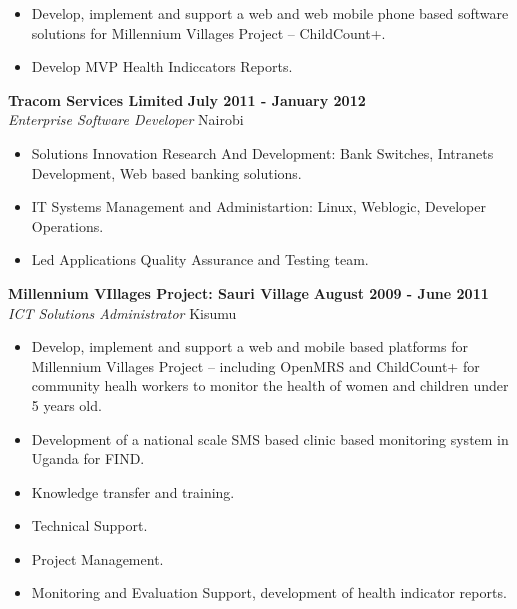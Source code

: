 \documentclass{res}
\begin{document}
\begin{resume}
\begin{itemize} \itemsep -2pt %
        \item Develop, implement and support a web and web mobile phone based software solutions for Millennium Villages Project – ChildCount+.
        \item Develop MVP Health Indiccators Reports.
 \end{itemize} \vspace{-4pt}

\vspace{8pt}
\textbf{Tracom Services Limited} \hfill        \textbf{July 2011 - January 2012} \\
\emph{Enterprise Software Developer}       \hfill   Nairobi

\begin{itemize} \itemsep -2pt %
        \item Solutions Innovation Research And Development: Bank Switches, Intranets Development, Web based banking solutions.
        \item IT Systems Management and Administartion: Linux, Weblogic, Developer Operations.
        \item Led Applications Quality Assurance and Testing team.
 \end{itemize} \vspace{-4pt}

\vspace{8pt}
\textbf{Millennium VIllages Project: Sauri Village} \hfill        \textbf{August 2009 - June 2011} \\
\emph{ICT Solutions Administrator}       \hfill   Kisumu

\begin{itemize} \itemsep -2pt %
        \item Develop, implement and support a web and mobile based platforms for Millennium Villages Project – including  OpenMRS and ChildCount+ for community healh workers to monitor the health of women and children under 5 years old.
        \item Development of a national scale SMS based clinic based monitoring system in Uganda for FIND.
        \item Knowledge transfer and training.
        \item Technical Support.
        \item Project Management.
        \item Monitoring and Evaluation Support, development of health indicator reports.
 \end{itemize} \vspace{-4pt}
 

\end{resume}
\end{document}
